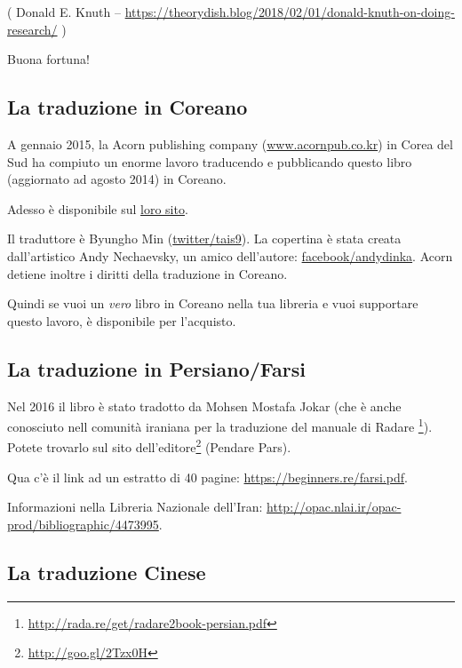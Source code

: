
( Donald E. Knuth -- \url{https://theorydish.blog/2018/02/01/donald-knuth-on-doing-research/} )

Buona fortuna!

\subsection*{La traduzione in Coreano}

A gennaio 2015, la Acorn publishing company (\href{http://www.acornpub.co.kr}{www.acornpub.co.kr}) in Corea del Sud ha compiuto un enorme lavoro traducendo e pubblicando
questo libro (aggiornato ad agosto 2014) in Coreano.

Adesso è disponibile sul \href{http://go.yurichev.com/17343}{loro sito}.

Il traduttore è Byungho Min (\href{http://go.yurichev.com/17344}{twitter/tais9}).
La copertina è stata creata dall'artistico Andy Nechaevsky, un amico dell'autore:
\href{http://go.yurichev.com/17023}{facebook/andydinka}.
Acorn detiene inoltre i diritti della traduzione in Coreano.

Quindi se vuoi un \emph{vero} libro in Coreano nella tua libreria e
vuoi supportare questo lavoro, è disponibile per l'acquisto.

\subsection*{La traduzione in Persiano/Farsi}

Nel 2016 il libro è stato tradotto da Mohsen Mostafa Jokar (che è anche conosciuto nell comunità iraniana per la traduzione del manuale di Radare \footnote{\url{http://rada.re/get/radare2book-persian.pdf}}).
Potete trovarlo sul sito dell'editore\footnote{\url{http://goo.gl/2Tzx0H}} (Pendare Pars).

Qua c'è il link ad un estratto di 40 pagine: \url{https://beginners.re/farsi.pdf}.

Informazioni nella Libreria Nazionale dell'Iran: \url{http://opac.nlai.ir/opac-prod/bibliographic/4473995}.

\subsection*{La traduzione Cinese}

